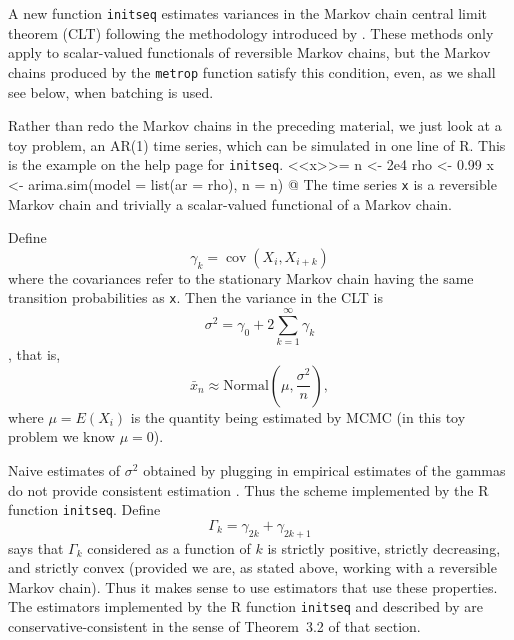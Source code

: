 \documentclass{article}
\DeclareMathOperator{\cov}{cov}
\begin{document}
	A new function \texttt{initseq} estimates variances in the Markov chain
	central limit theorem (CLT) following the methodology introduced by
	\citet[Section~3.3]{practical}.  These methods only apply to scalar-valued
	functionals of
	reversible Markov chains, but the Markov chains produced by the \texttt{metrop}
	function satisfy this condition, even, as we shall see below, when batching
	is used.
	
	Rather than redo the Markov chains in the preceding material, we just look
	at a toy problem, an AR(1) time series, which can be simulated in one line
	of R.  This is the example on the help page for \texttt{initseq}.
	<<x>>=
	n <- 2e4
	rho <- 0.99
	x <- arima.sim(model = list(ar = rho), n = n)
	@
	The time series \texttt{x} is a reversible Markov chain and trivially
	a scalar-valued functional of a Markov chain.
	
	Define
	\begin{equation} \label{eq:little}
	\gamma_k = \cov(X_i, X_{i + k})
	\end{equation}
	where the covariances refer to the stationary Markov chain having the
	same transition probabilities as \texttt{x}.  Then the variance in the CLT
	is
	$$
	\sigma^2 = \gamma_0 + 2 \sum_{k = 1}^\infty \gamma_k
	$$
	\citep[Theorem~2.1]{practical}, that is,
	$$
	\bar{x}_n \approx \text{Normal}\left(\mu, \frac{\sigma^2}{n}\right),
	$$
	where $\mu = E(X_i)$ is the quantity being estimated by MCMC (in this
	toy problem we know $\mu = 0$).
	
	Naive estimates of $\sigma^2$ obtained by plugging in empirical
	estimates of the gammas do not provide consistent estimation
	\citep[Section~3.1]{practical}.  Thus the scheme implemented
	by the R function \texttt{initseq}.  Define
	\begin{equation} \label{eq:big}
	\Gamma_k = \gamma_{2 k} + \gamma_{2 k + 1}
	\end{equation}
	\citet[Theorem~3.1]{practical} says that $\Gamma_k$ considered as a function
	of $k$ is strictly positive, strictly decreasing, and strictly convex
	(provided we are, as stated above, working with a reversible Markov chain).
	Thus it makes sense to use estimators that use these properties.
	The estimators implemented by the R function \texttt{initseq} and
	described by \citet[Section~3.3]{practical} are conservative-consistent
	in the sense of Theorem~3.2 of that section.
	
\end{document}
